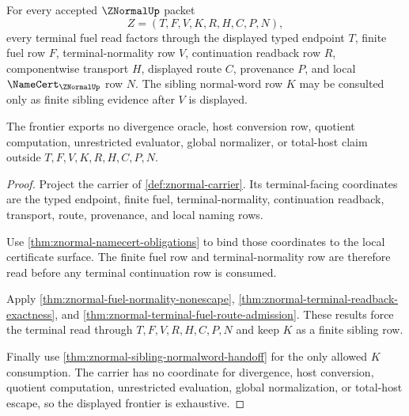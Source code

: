 \begin{theorem}
\label{thm:znormal-terminal-fuel-readback-frontier}
For every accepted $\ZNormalUp$ packet
$$
Z=(T,F,V,K,R,H,C,P,N),
$$
every terminal fuel read factors through the displayed typed endpoint $T$,
finite fuel row $F$, terminal-normality row $V$, continuation readback row
$R$, componentwise transport $H$, displayed route $C$, provenance $P$, and
local $\NameCert_{\ZNormalUp}$ row $N$. The sibling normal-word row $K$ may be
consulted only as finite sibling evidence after $V$ is displayed.

The frontier exports no divergence oracle, host conversion row, quotient
computation, unrestricted evaluator, global normalizer, or total-host claim
outside $T,F,V,K,R,H,C,P,N$.
\end{theorem}
\begin{proof}
Project the carrier of \autoref{def:znormal-carrier}. Its terminal-facing
coordinates are the typed endpoint, finite fuel, terminal-normality,
continuation readback, transport, route, provenance, and local naming rows.

Use \autoref{thm:znormal-namecert-obligations} to bind those coordinates to
the local certificate surface. The finite fuel row and terminal-normality row
are therefore read before any terminal continuation row is consumed.

Apply \autoref{thm:znormal-fuel-normality-nonescape},
\autoref{thm:znormal-terminal-readback-exactness}, and
\autoref{thm:znormal-terminal-fuel-route-admission}. These results force the
terminal read through $T,F,V,R,H,C,P,N$ and keep $K$ as a finite sibling row.

Finally use \autoref{thm:znormal-sibling-normalword-handoff} for the only
allowed $K$ consumption. The carrier has no coordinate for divergence, host
conversion, quotient computation, unrestricted evaluation, global
normalization, or total-host escape, so the displayed frontier is exhaustive.
\end{proof}

